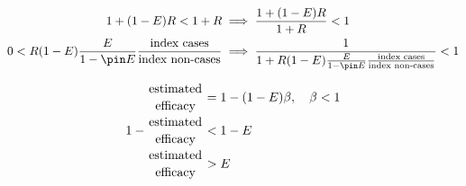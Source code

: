 \documentclass{article}
\begin{document}
\begin{equation*}\begin{aligned}
1 + (1-E)R < 1 + R &\implies \frac{1 + (1-E)R}{1 + R} < 1\\
0 < R(1-E)\frac{E}{1-\pin E}\frac{\textrm{index cases}}{\textrm{index non-cases}} &\implies \frac{1}{1+R(1-E)\frac{E}{1-\pin E}\frac{\textrm{index cases}}{\textrm{index non-cases}}} < 1
\end{aligned}\end{equation*}

\begin{equation*}\begin{aligned}
\genfrac{}{}{0pt}{}{\textrm{estimated}}{\textrm{efficacy}} &= 1 - (1-E)\beta,\quad \beta < 1\\
1-\genfrac{}{}{0pt}{}{\textrm{estimated}}{\textrm{efficacy}} &<  1-E\\
\genfrac{}{}{0pt}{}{\textrm{estimated}}{\textrm{efficacy}} &> E
\end{aligned}\end{equation*}
\end{document}
